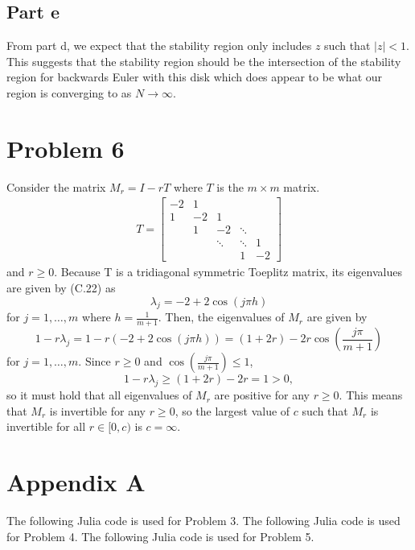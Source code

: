 \documentclass{article}
\begin{document}
\subsection{Part e}
From part d, we expect that the stability region only includes $z$ such that $|z|<1$. This suggests that the stability region should be the intersection of the stability region for backwards Euler with this disk which does appear to be what our region is converging to as $N\to\infty$.

\section{Problem 6}
Consider the matrix $M_r = I - r T$ where $T$ is the $m\times m$ matrix.
\begin{align*}
	T = \begin{bmatrix}
		-2 & 1 \\
		1 & -2 & 1 \\
		& 1 &-2 & \ddots\\
		& &\ddots & \ddots & 1\\
		&&& 1 & -2 \end{bmatrix}
\end{align*}
and $r \geq 0$. Because T is a tridiagonal symmetric Toeplitz matrix, its eigenvalues are given by (C.22) as 
\[
\lambda_j=-2+2\cos(j\pi h)
\]
for $j=1,\ldots,m$ where $h=\frac{1}{m+1}$. Then, the eigenvalues of $M_r$ are given by
\[
1-r\lambda_j=1-r(-2+2\cos(j\pi h))=(1+2r)-2r\cos\left(\frac{j\pi}{m+1}\right)
\]
for $j=1,\ldots,m$. Since $r\geq0$ and $\cos\left(\frac{j\pi}{m+1}\right)\leq1$,
\[
1-r\lambda_j\geq(1+2r)-2r=1>0,
\]
so it must hold that all eigenvalues of $M_r$ are positive for any $r\geq0$. This means that $M_r$ is invertible for any $r\geq0$, so the largest value of $c$ such that $M_r$ is invertible for all $ r \in [0,c)$ is $c=\infty$.

\section{Appendix A}
The following Julia code is used for Problem 3.
The following Julia code is used for Problem 4.
The following Julia code is used for Problem 5.
\end{document}
